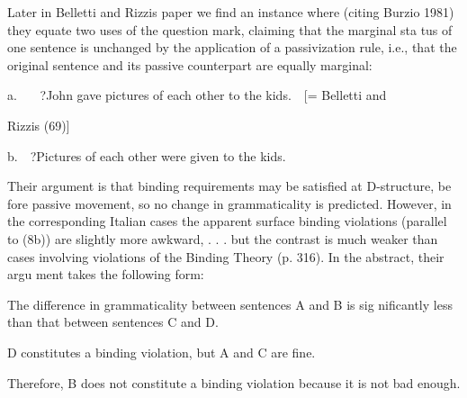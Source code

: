 \begin{styleStandard}
Later in Belletti and Rizzi{\textquotesingle}s paper we find an instance where (citing Burzio 1981) they equate two uses of the question mark, claiming that the marginal sta\- tus of one sentence is unchanged by the application of a passivization rule, i.e., that the original sentence and its passive counterpart are equally marginal:
\end{styleStandard}


\setcounter{listWWNumlixleveli}{7}
\begin{listWWNumlixleveli}
\item 
\begin{styleStandard}
a. \ \ \ ?John gave pictures of each other to the kids.\ \ [= Belletti and
\end{styleStandard}


\end{listWWNumlixleveli}
\begin{styleStandard}
Rizzi{\textquotesingle}s (69)]
\end{styleStandard}


\begin{styleStandard}
b.\ \ ?Pictures of each other were given to the kids.
\end{styleStandard}


\begin{styleStandard}
Their argument is that binding requirements may be satisfied at D-structure, be\- fore passive movement, so no change in grammaticality is predicted. However, in the corresponding Italian cases the apparent surface binding violations (parallel to (8b)) are {\textquotedbl}slightly more awkward, . . . but the contrast is much weaker than cases involving violations of the Binding Theory{\textquotedbl} (p. 316). In the abstract, their argu\- ment takes the following form:
\end{styleStandard}


\begin{styleStandard}
The difference in grammaticality between sentences A and B is sig\- nificantly less than that between sentences C and D.
\end{styleStandard}


\begin{styleStandard}
D constitutes a binding violation, but A and C are fine.
\end{styleStandard}


\begin{styleStandard}
Therefore, B does not constitute a binding violation because it is not bad enough.
\end{styleStandard}


